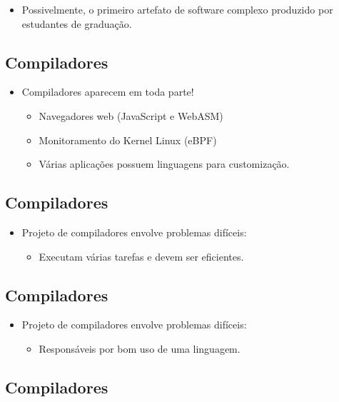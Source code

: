 \documentclass[11pt]{article}
\begin{document}
\begin{itemize}
\item Possivelmente, o primeiro artefato de software complexo produzido por estudantes de graduação.
\end{itemize}
\subsection*{Compiladores}
\label{sec:org7181bb5}

\begin{itemize}
\item Compiladores aparecem em toda parte!
\begin{itemize}
\item Navegadores web (JavaScript e WebASM)
\item Monitoramento do Kernel Linux (eBPF)
\item Várias aplicações possuem linguagens para customização.
\end{itemize}
\end{itemize}
\subsection*{Compiladores}
\label{sec:orgb21c22c}

\begin{itemize}
\item Projeto de compiladores envolve problemas difíceis:
\begin{itemize}
\item Executam várias tarefas e devem ser eficientes.
\end{itemize}
\end{itemize}
\subsection*{Compiladores}
\label{sec:org83aee84}

\begin{itemize}
\item Projeto de compiladores envolve problemas difíceis:
\begin{itemize}
\item Responsáveis por bom uso de uma linguagem.
\end{itemize}
\end{itemize}
\subsection*{Compiladores}
\label{sec:org22cc0a2}
\end{document}
